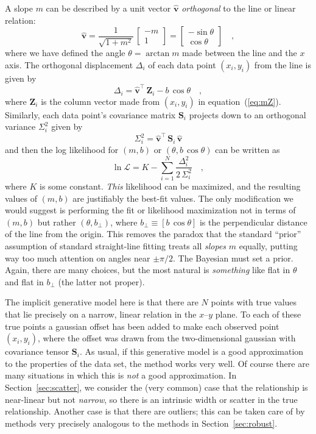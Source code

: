 \documentclass[12pt,twoside]{article}
\newcommand{\sectionname}{Section}
\newcommand{\equationname}{equation}
\newcommand{\mmatrix}[1]{\boldsymbol{#1}}
\newcommand{\transpose}[1]{{#1}^{\scriptscriptstyle \top}}
\newcommand{\mS}{\mmatrix{S}}
\newcommand{\mZ}{\mmatrix{Z}}
\newcommand{\vhat}{\mmatrix{\hat{v}}}
\newcommand{\like}{\mathscr{L}}
\newcommand{\bperp}{b_{\perp}}
\begin{document}
A slope $m$ can be described by a unit vector $\vhat$
\emph{orthogonal} to the line or linear relation:
\begin{equation}
\vhat
 = \frac{1}{\sqrt{1+m^2}}\,\left[\begin{array}{c}-m\\1\end{array}\right]
 = \left[\begin{array}{c}-\sin\theta\\\cos\theta\end{array}\right] \quad ,
\end{equation}
where we have defined the angle $\theta = \arctan m$ made between the
line and the $x$ axis.  The orthogonal displacement $\Delta_i$ of each
data point $(x_i,y_i)$ from the line is given by
\begin{equation}
\Delta_i = \transpose{\vhat}\,\mZ_i - b\,\cos\theta \quad ,
\end{equation}
where $\mZ_i$ is the column vector made from $(x_i,y_i)$ in
\equationname~(\ref{eq:mZ}).  Similarly, each data point's covariance
matrix $\mS_i$ projects down to an orthogonal variance $\Sigma_i^2$ given by
\begin{equation}\label{eq:Sigma}
\Sigma_i^2 = \transpose{\vhat}\,\mS_i\,\vhat
\end{equation}
and then the log likelihood for $(m,b)$ or $(\theta,b\,\cos\theta)$
can be written as
\begin{equation}\label{eq:twodlike}
\ln\like = K - \sum_{i=1}^N \frac{\Delta_i^2}{2\,\Sigma_{i}^2} \quad ,
\end{equation}
where $K$ is some constant.  \emph{This} likelihood can be maximized,
and the resulting values of $(m,b)$ are justifiably the best-fit
values.  The only modification we would suggest is performing the fit
or likelihood maximization not in terms of $(m,b)$ but rather
$(\theta,\bperp)$, where $\bperp\equiv[b\,\cos\theta]$ is the
perpendicular distance of the line from the origin.  This removes the
paradox that the standard ``prior'' assumption of standard
straight-line fitting treats all \emph{slopes} $m$ equally, putting
way too much attention on angles near $\pm\pi/2$.  The Bayesian must
set a prior.  Again, there are many choices, but the most natural
is \emph{something} like flat in $\theta$ and flat in $\bperp$ (the
latter not proper).

The implicit generative model here is that there are $N$ points with
true values that lie precisely on a narrow, linear relation in the
$x$--$y$ plane.  To each of these true points a gaussian offset has
been added to make each observed point $(x_i,y_i)$, where the offset
was drawn from the two-dimensional gaussian with covariance tensor
$\mS_i$.  As usual, if this generative model is a good approximation
to the properties of the data set, the method works very well.  Of
course there are many situations in which this is \emph{not} a good
approximation.  In \sectionname~\ref{sec:scatter}, we consider the
(very common) case that the relationship is near-linear but not
\emph{narrow}, so there is an intrinsic width or scatter in the true
relationship.  Another case is that there are outliers; this can be
taken care of by methods very precisely analogous to the methods in
\sectionname~\ref{sec:robust}.
\end{document}
